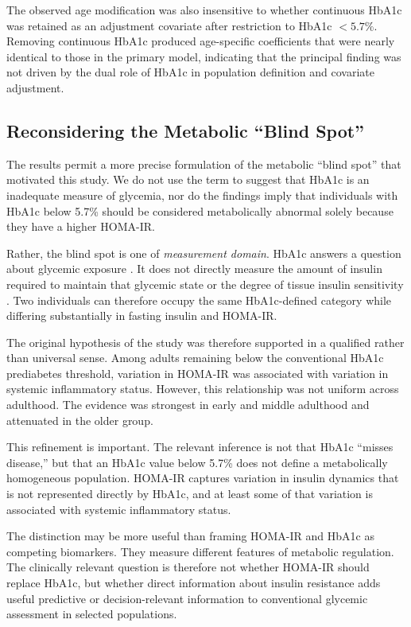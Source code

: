 \documentclass[11pt]{article}
\begin{document}
The observed age modification was also insensitive to whether continuous
HbA1c was retained as an adjustment covariate after restriction to
HbA1c $<5.7\%$. Removing continuous HbA1c produced age-specific coefficients
that were nearly identical to those in the primary model, indicating that
the principal finding was not driven by the dual role of HbA1c in population
definition and covariate adjustment.

\subsection{Reconsidering the Metabolic ``Blind Spot''}

The results permit a more precise formulation of the metabolic ``blind
spot'' that motivated this study. We do not use the term to suggest that
HbA1c is an inadequate measure of glycemia, nor do the findings imply that
individuals with HbA1c below 5.7\% should be considered metabolically
abnormal solely because they have a higher HOMA-IR.

Rather, the blind spot is one of \emph{measurement domain}. HbA1c answers
a question about glycemic exposure \citep{Nathan2007,ADA2026Diagnosis}. It does not directly measure the amount
of insulin required to maintain that glycemic state or the degree of tissue
insulin sensitivity \citep{Matthews1985,Wallace2004}. Two individuals can therefore occupy the same
HbA1c-defined category while differing substantially in fasting insulin
and HOMA-IR.

The original hypothesis of the study was therefore supported in a qualified
rather than universal sense. Among adults remaining below the conventional
HbA1c prediabetes threshold, variation in HOMA-IR was associated with
variation in systemic inflammatory status. However, this relationship was
not uniform across adulthood. The evidence was strongest in early and
middle adulthood and attenuated in the older group.

This refinement is important. The relevant inference is not that HbA1c
``misses disease,'' but that an HbA1c value below 5.7\% does not define a
metabolically homogeneous population. HOMA-IR captures variation in insulin
dynamics that is not represented directly by HbA1c, and at least some of
that variation is associated with systemic inflammatory status.

The distinction may be more useful than framing HOMA-IR and HbA1c as
competing biomarkers. They measure different features of metabolic
regulation. The clinically relevant question is therefore not whether
HOMA-IR should replace HbA1c, but whether direct information about insulin
resistance adds useful predictive or decision-relevant information to
conventional glycemic assessment in selected populations.
\end{document}
